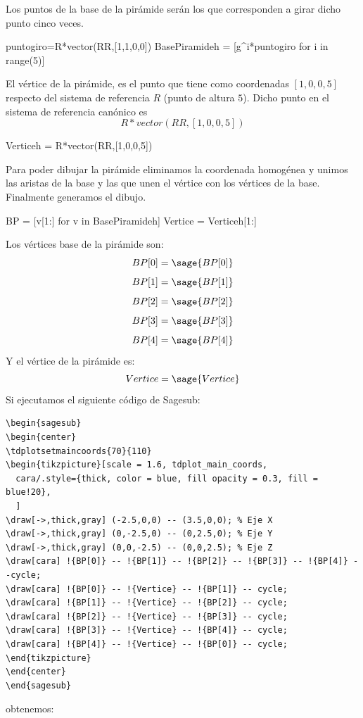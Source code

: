 \documentclass{amsart}
\begin{document}
Los puntos de la base de la pirámide serán los que corresponden a girar dicho punto cinco veces. 

\begin{sageblock}
puntogiro=R*vector(RR,[1,1,0,0])
BasePiramideh = [g^i*puntogiro for i in range(5)]
\end{sageblock}

El vértice de la pirámide, es el punto que tiene como coordenadas $[1,0,0,5]$ respecto del sistema de referencia $R$ (punto de altura $5$). Dicho punto en el sistema de referencia canónico es $$R*vector(RR,[1,0,0,5])$$

\begin{sageblock}
Verticeh = R*vector(RR,[1,0,0,5])
\end{sageblock}

Para poder dibujar la pirámide eliminamos la coordenada homogénea y unimos las aristas de la base y las que unen el vértice con los vértices de la base. Finalmente generamos el dibujo.

\begin{sageblock}
BP = [v[1:] for v in BasePiramideh]
Vertice = Verticeh[1:]
\end{sageblock}
Los vértices base de la pirámide son:
$$BP[0]=\sage{BP[0]}$$
$$BP[1]=\sage{BP[1]}$$
$$BP[2]=\sage{BP[2]}$$
$$BP[3]=\sage{BP[3]}$$
$$BP[4]=\sage{BP[4]}$$
Y el vértice de la pirámide es:
$$Vertice=\sage{Vertice}$$
Si ejecutamos el siguiente código de Sagesub:
\begin{verbatim}
\begin{sagesub}
\begin{center}
\tdplotsetmaincoords{70}{110}
\begin{tikzpicture}[scale = 1.6, tdplot_main_coords,
  cara/.style={thick, color = blue, fill opacity = 0.3, fill = blue!20},
  ]
\draw[->,thick,gray] (-2.5,0,0) -- (3.5,0,0); % Eje X
\draw[->,thick,gray] (0,-2.5,0) -- (0,2.5,0); % Eje Y
\draw[->,thick,gray] (0,0,-2.5) -- (0,0,2.5); % Eje Z
\draw[cara] !{BP[0]} -- !{BP[1]} -- !{BP[2]} -- !{BP[3]} -- !{BP[4]} --cycle;
\draw[cara] !{BP[0]} -- !{Vertice} -- !{BP[1]} -- cycle;
\draw[cara] !{BP[1]} -- !{Vertice} -- !{BP[2]} -- cycle;
\draw[cara] !{BP[2]} -- !{Vertice} -- !{BP[3]} -- cycle;
\draw[cara] !{BP[3]} -- !{Vertice} -- !{BP[4]} -- cycle;
\draw[cara] !{BP[4]} -- !{Vertice} -- !{BP[0]} -- cycle;
\end{tikzpicture}
\end{center}
\end{sagesub}
\end{verbatim}
obtenemos:
\end{document}

